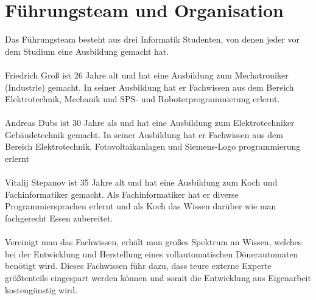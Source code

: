 
\section{Führungsteam und Organisation}
Das Führungsteam besteht aus drei Informatik Studenten, von denen jeder vor dem Studium eine Ausbildung gemacht hat.
\\\\
Friedrich Groß ist 26 Jahre alt und hat eine Ausbildung zum Mechatroniker (Industrie) gemacht.
In seiner Ausbildung hat er Fachwissen aus dem Bereich Elektrotechnik, Mechanik und SPS- und Roboterprogrammierung erlernt.
\\\\
Andreas Dubs ist 30 Jahre als und hat eine Ausbildung zum Elektrotechniker Gebäudetechnik gemacht.
In seiner Ausbildung hat er Fachwissen aus dem Bereich Elektrotechnik, Fotovoltaikanlagen und Siemens-Logo programmierung erlernt
\\\\
Vitalij Stepanov ist 35 Jahre alt und hat eine Ausbildung zum Koch und Fachinformatiker gemacht.
Als Fachinformatiker hat er diverse Programmiersprachen erlernt und als Koch das Wissen darüber wie man fachgerecht Essen zubereitet.
\\\\
Vereinigt man das Fachwissen, erhält man großes Spektrum an Wissen, welches bei der Entwicklung und Herstellung eines
vollautomatischen Dönerautomaten benötigt wird. Dieses Fachwissen führ dazu, dass teure externe Experte größtenteils
eingespart werden können und somit die Entwicklung aus Eigenarbeit kostengünstig wird.
